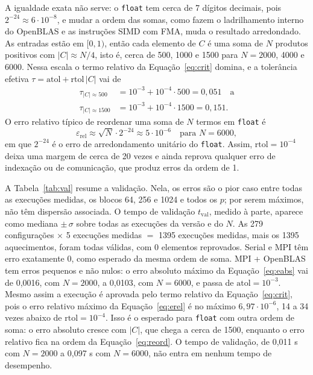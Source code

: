 \documentclass[Portugues]{ic-tese-v3}
\DeclareRobustCommand{\_}{\textunderscore\allowbreak} %
\begin{document}
A igualdade exata não serve: o \texttt{float} tem cerca de 7 dígitos decimais, pois $2^{-24}\approx 6\cdot10^{-8}$, e mudar a ordem das somas, como fazem o ladrilhamento interno do OpenBLAS e as instruções SIMD com FMA, muda o resultado arredondado. As entradas estão em $[0,1)$, então cada elemento de $C$ é uma soma de $N$ produtos positivos com $|C|\approx N/4$, isto é, cerca de 500, 1000 e 1500 para $N=2000$, 4000 e 6000. Nessa escala o termo relativo da Equação~\eqref{eq:crit} domina, e a tolerância efetiva $\tau = \mathrm{atol} + \mathrm{rtol}\,|C|$ vai de
\begin{equation}\label{eq:tol}
\begin{aligned}
\tau_{|C|\approx 500} &= 10^{-3} + 10^{-4}\cdot 500 = 0{,}051 \quad \text{a} \\
\tau_{|C|\approx 1500} &= 10^{-3} + 10^{-4}\cdot 1500 = 0{,}151.
\end{aligned}
\end{equation}
O erro relativo típico de reordenar uma soma de $N$ termos em \texttt{float} é
\begin{equation}\label{eq:reord}
\varepsilon_{\mathrm{rel}} \approx \sqrt{N}\cdot 2^{-24} \approx 5\cdot10^{-6} \quad \text{para } N = 6000,
\end{equation}
em que $2^{-24}$ é o erro de arredondamento unitário do \texttt{float}. Assim, $\mathrm{rtol}=10^{-4}$ deixa uma margem de cerca de 20 vezes e ainda reprova qualquer erro de indexação ou de comunicação, que produz erros da ordem de 1.

A Tabela~\ref{tab:val} resume a validação. Nela, os erros são o pior caso entre todas as execuções medidas, os blocos 64, 256 e 1024 e todos os $p$; por serem máximos, não têm dispersão associada. O tempo de validação $t_{\mathrm{val}}$, medido à parte, aparece como mediana $\pm\,\sigma$ sobre todas as execuções da versão e do $N$. As 279 configurações $\times$ 5 execuções medidas $=$ 1395 execuções medidas, mais os 1395 aquecimentos, foram todas válidas, com 0 elementos reprovados. Serial e MPI têm erro exatamente 0, como esperado da mesma ordem de soma. MPI + OpenBLAS tem erros pequenos e não nulos: o erro absoluto máximo da Equação~\eqref{eq:eabs} vai de 0,0016, com $N=2000$, a 0,0103, com $N=6000$, e passa de $\mathrm{atol}=10^{-3}$. Mesmo assim a execução é aprovada pelo termo relativo da Equação~\eqref{eq:crit}, pois o erro relativo máximo da Equação~\eqref{eq:erel} é no máximo $6{,}97\cdot10^{-6}$, 14 a 34 vezes abaixo de $\mathrm{rtol}=10^{-4}$. Isso é o esperado para \texttt{float} com outra ordem de soma: o erro absoluto cresce com $|C|$, que chega a cerca de 1500, enquanto o erro relativo fica na ordem da Equação~\eqref{eq:reord}. O tempo de validação, de 0,011 s com $N=2000$ a 0,097 s com $N=6000$, não entra em nenhum tempo de desempenho.
\end{document}
